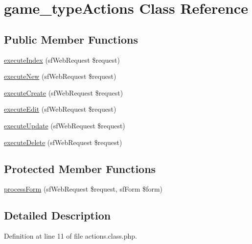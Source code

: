 \hypertarget{classgame__type_actions}{\section{game\-\_\-type\-Actions Class Reference}
\label{classgame__type_actions}
}
\subsection*{Public Member Functions}
\begin{DoxyCompactItemize}
\item 
\hyperlink{classgame__type_actions_a948cc911eb1d9f77990be54af3b2080f}{execute\-Index} (sf\-Web\-Request \$request)
\item 
\hyperlink{classgame__type_actions_a0ffbea56560c6c633dae68ec22aff21c}{execute\-New} (sf\-Web\-Request \$request)
\item 
\hyperlink{classgame__type_actions_a75837617743fb64dca82d8133b2c662a}{execute\-Create} (sf\-Web\-Request \$request)
\item 
\hyperlink{classgame__type_actions_af4d8fedd4b28f3398826a1bb8fa54394}{execute\-Edit} (sf\-Web\-Request \$request)
\item 
\hyperlink{classgame__type_actions_af7b4f51862add3c2ebb54efc136a0840}{execute\-Update} (sf\-Web\-Request \$request)
\item 
\hyperlink{classgame__type_actions_a52b5b11b11a0070dd2662257520c045a}{execute\-Delete} (sf\-Web\-Request \$request)
\end{DoxyCompactItemize}
\subsection*{Protected Member Functions}
\begin{DoxyCompactItemize}
\item 
\hyperlink{classgame__type_actions_a7cf661d837626e0320753cbffa019a01}{process\-Form} (sf\-Web\-Request \$request, sf\-Form \$form)
\end{DoxyCompactItemize}


\subsection{Detailed Description}


Definition at line 11 of file actions.\-class.\-php.



